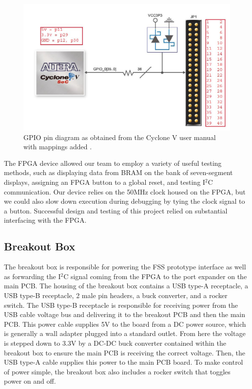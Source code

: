 \documentclass[conference]{IEEEtran}
\begin{document}
\begin{figure}[bhtp]
    \centering
    \includegraphics[scale=0.5]{./resources/figures/gpio_pin_map.jpg}
    \caption{GPIO pin diagram as obtained from the Cyclone V user manual with mappings added \cite{cite:de1-soc_manual}.}
    \label{fig:gpio_mapping}
\end{figure}

The FPGA device allowed our team to employ a variety of useful testing methods, such as displaying data from BRAM on the bank of seven-segment displays, assigning an FPGA button to a global reset, and testing I$^2$C communication. Our device relies on the 50MHz clock housed on the FPGA, but we could also slow down execution during debugging by tying the clock signal to a button. Successful design and testing of this project relied on substantial interfacing with the FPGA.

\subsection{Breakout Box}
The breakout box is responsible for powering the FSS prototype interface as well as forwarding the I$^2$C signal coming from the FPGA to the port expander on the main PCB. The housing of the breakout box contains a USB type-A receptacle, a USB type-B receptacle, 2 male pin headers, a buck converter, and a rocker switch. The USB type-B receptacle is responsible for receiving power from the USB cable voltage bus and delivering it to the breakout PCB and then the main PCB. This power cable supplies 5V to the board from a DC power source, which is generally a wall adapter plugged into a standard outlet. From here the voltage is stepped down to 3.3V by a DC-DC buck converter contained within the breakout box to ensure the main PCB is receiving the correct voltage. Then, the USB type-A cable supplies this power to the main PCB board. To make control of power simple, the breakout box also includes a rocker switch that toggles power on and off.
\end{document}
